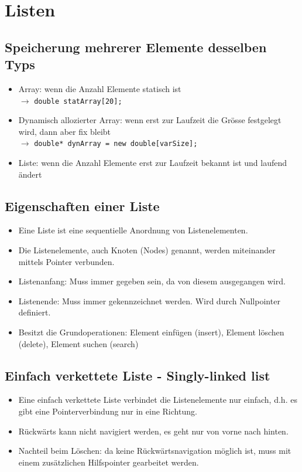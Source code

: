 \section{Listen}
\subsection{Speicherung mehrerer Elemente desselben Typs}
\begin{itemize}
  \item Array: wenn die Anzahl Elemente statisch ist \\ $\rightarrow$  \lstinline{double statArray[20];}
  \item Dynamisch allozierter Array: wenn erst zur Laufzeit die Grösse festgelegt wird, dann aber fix bleibt \\ $\rightarrow$
  \lstinline{double* dynArray = new double[varSize];}
  \item Liste: wenn die Anzahl Elemente erst zur Laufzeit bekannt ist und laufend ändert
\end{itemize}

\subsection{Eigenschaften einer Liste}
\begin{itemize}
  \item Eine Liste ist eine sequentielle Anordnung von Listenelementen.
  \item Die Listenelemente, auch Knoten (Nodes) genannt, werden miteinander mittels Pointer verbunden.
  \item Listenanfang: Muss immer gegeben sein, da von diesem ausgegangen wird.
  \item Listenende: Muss immer gekennzeichnet werden. Wird durch Nullpointer definiert.
  \item Besitzt die Grundoperationen: Element einfügen (insert), Element löschen (delete), Element suchen (search)
\end{itemize}

\subsection{Einfach verkettete Liste - Singly-linked list}
\begin{itemize}
  \item Eine einfach verkettete Liste verbindet die Listenelemente nur einfach, d.h. es gibt eine Pointerverbindung nur in eine Richtung.
  \item Rückwärts kann nicht navigiert werden, es geht nur von vorne nach hinten.
  \item Nachteil beim Löschen: da keine Rückwärtsnavigation möglich ist, muss mit einem zusätzlichen Hilfspointer gearbeitet werden.
\end{itemize}

